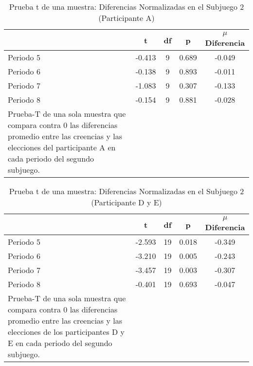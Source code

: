 \begin{table}[h]
\caption[Prueba t de una muestra: Diferencias Normalizadas en el Subjuego 2 (Participante A)]{Prueba t de una muestra: Diferencias Normalizadas en el Subjuego 2 (Participante A)}
\label{DN-S1}
\centering
\begin{tabular}{l | c c c | c}
\toprule
\textbf{} & \textbf{t} & \textbf{df} & \textbf{p} & \textbf{$\mu$Diferencia}\\
\midrule
Periodo 5 & -0.413 & 9 & 0.689 & -0.049\\
Periodo 6 & -0.138 & 9 & 0.893 & -0.011\\
Periodo 7 & -1.083 & 9 & 0.307 & -0.133\\
Periodo 8 & -0.154 & 9 & 0.881 & -0.028\\
\bottomrule
Prueba-T de una sola muestra que compara contra 0 las diferencias promedio entre las creencias y las elecciones del participante A en cada periodo del segundo subjuego.
\end{tabular}
\end{table}













\begin{table}[h]
\caption[Prueba t de una muestra: Diferencias Normalizadas en el Subjuego 2 (Participantes D y E)]{Prueba t de una muestra: Diferencias Normalizadas en el Subjuego 2 (Participante D y E)}
\label{DN-S1}
\centering
\begin{tabular}{l | c c c | c}
\toprule
\textbf{} & \textbf{t} & \textbf{df} & \textbf{p} & \textbf{$\mu$Diferencia}\\
\midrule
Periodo 5 & -2.593 & 19 & 0.018 & -0.349\\
Periodo 6 & -3.210 & 19 & 0.005 & -0.243\\
Periodo 7 & -3.457 & 19 & 0.003 & -0.307\\
Periodo 8 & -0.401 & 19 & 0.693 & -0.047\\
\bottomrule
Prueba-T de una sola muestra que compara contra 0 las diferencias promedio entre las creencias y las elecciones de los participantes D y E en cada periodo del segundo subjuego.
\end{tabular}
\end{table}












